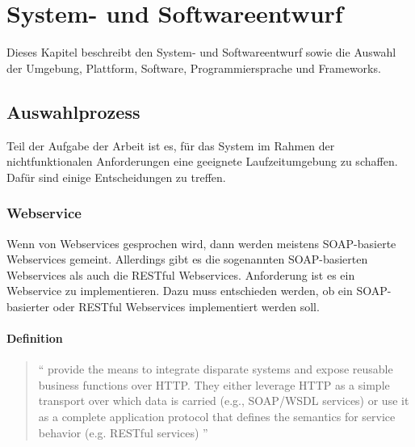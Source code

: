 \chapter{System- und Softwareentwurf} \label{kap:systemundsoftwarentwurf}


Dieses Kapitel beschreibt den System- und Softwareentwurf sowie die Auswahl der Umgebung, Plattform, Software, Programmiersprache und Frameworks.

\section{Auswahlprozess}

Teil der Aufgabe der Arbeit ist es, für das System im Rahmen der nichtfunktionalen Anforderungen eine geeignete Laufzeitumgebung zu schaffen. Dafür sind einige Entscheidungen zu treffen. 

\subsection{Webservice}\label{sec:webservice}
Wenn von \glspl{Webservice} gesprochen wird, dann werden meistens \gls{SOAP}-basierte \glspl{Webservice} gemeint. Allerdings gibt es die sogenannten \gls{SOAP}-basierten \glspl{Webservice} als auch die \gls{REST}ful \glspl{Webservice}. Anforderung ist es ein \gls{Webservice} zu implementieren. Dazu muss entschieden werden, ob ein \gls{SOAP}-basierter oder \gls{REST}ful \glspl{Webservice} implementiert werden soll. 

\subsubsection{Definition}

\begin{quotation}
\enquote{ provide the means to integrate disparate systems and expose reusable business functions over \gls{HTTP}. They either leverage \gls{HTTP} as a simple transport over which data is carried (e.g., \gls{SOAP}/\gls{WSDL} services) or use it as a complete application protocol that defines the semantics for service behavior (e.g. RESTful services) \citep[S. 2][]{robinsonService}}	
\end{quotation}

